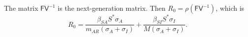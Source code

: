 \documentclass[11pt]{article}
\newcommand{\mat}[1]{\mathsf{#1}}
\begin{document}
	The matrix $\mat{F} \mat{V}^{-1}$ is the next-generation matrix.
	Then $R_0 = \rho (\mat{F} \mat{V}^{-1})$, which is
	\begin{equation} \label{eq:r0}
		R_0 = \frac{\beta_{SA} S^* \sigma_A}{m_{AR} (\sigma_A + \sigma_I)} + \frac{\beta_{SI} S^* \sigma_I}{M (\sigma_A + \sigma_I)}.
	\end{equation}
	



\end{document}
